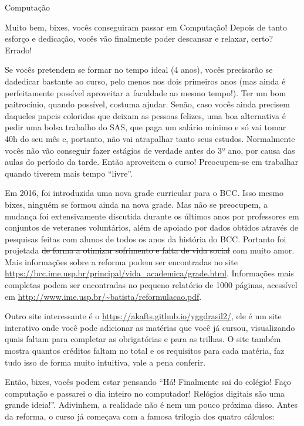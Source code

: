 \begin{subsecao}{Computação}

Muito bem, bixes, vocês conseguiram passar em Computação! Depois de tanto
esforço e dedicação, vocês vão finalmente poder descansar e relaxar, certo?
Errado!

Se vocês pretendem se formar no tempo ideal (4 anos), vocês precisarão se
dadedicar bastante ao curso, pelo menos nos dois primeiros anos (mas ainda é
perfeitamente possível aproveitar a faculdade ao mesmo tempo!). Ter um bom
paitrocínio, quando possível, costuma ajudar. Senão, caso vocês ainda precisem
daqueles papeis coloridos que deixam as pessoas felizes, uma boa alternativa é
pedir uma bolsa trabalho do SAS, que paga um salário mínimo e só vai tomar
40h do seu mês e, portanto, não vai atrapalhar tanto seus estudos. Normalmente
vocês não vão conseguir fazer estágios de verdade antes do 3º ano, por causa
das aulas do período da tarde. Então aproveitem o curso! Preocupem-se em
trabalhar quando tiverem mais tempo ``livre''.

Em 2016, foi introduzida uma nova grade curricular para o
BCC. Isso mesmo bixes, ninguém se formou ainda na nova grade. Mas não se preocupem, a
mudança foi extensivamente discutida durante os últimos anos por professores em
conjuntos de veteranes voluntários, além de apoiado por dados obtidos através de
pesquisas feitas com alunos de todos os anos da história do BCC. Portanto foi
projetada \sout{de forma a otimizar sofrimento e falta de vida social} com muito
amor. Mais informações sobre a reforma podem ser encontradas no site
\url{https://bcc.ime.usp.br/principal/vida_academica/grade.html}. Informações mais completas podem ser
encontradas no pequeno relatório de 1000 páginas, acessível em
\url{http://www.ime.usp.br/~batista/reformulacao.pdf}.

Outro site interessante é o \url{https://akafts.github.io/yggdrasil2/}, ele é um site interativo onde você pode adicionar as matérias que você já cursou, visualizando quais faltam para completar as obrigatórias e para as trilhas. O site também mostra quantos créditos faltam no total e os requisitos para cada matéria, faz tudo isso de forma muito intuitiva, vale a pena conferir.

Então, bixes, vocês podem estar pensando ``Há! Finalmente sai do colégio! Faço
computação e passarei o dia inteiro no computador! Relógios digitais são uma
grande ideia!''. Adivinhem, a realidade não é nem um pouco próxima disso. Antes
da reforma, o curso já começava com a famosa trilogia dos quatro cálculos:


\end{subsecao}
